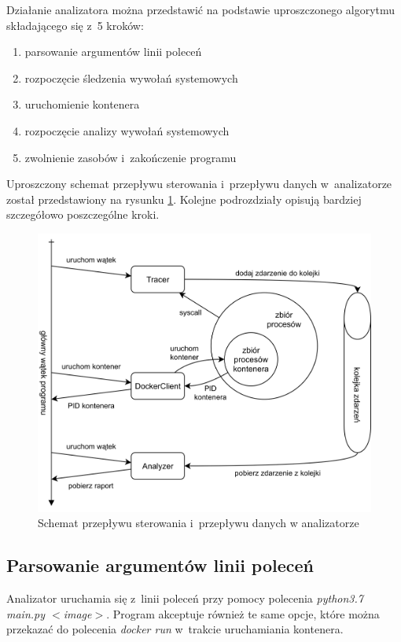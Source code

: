 Działanie analizatora można przedstawić na podstawie uproszczonego algorytmu składającego się z~5 kroków:
\begin{enumerate}
    \item parsowanie argumentów linii poleceń
    \item rozpoczęcie śledzenia wywołań systemowych
    \item uruchomienie kontenera
    \item rozpoczęcie analizy wywołań systemowych
    \item zwolnienie zasobów i~zakończenie programu
\end{enumerate}
Uproszczony schemat przepływu sterowania i~przepływu danych w~analizatorze został przedstawiony na rysunku \ref{fig:analyzerFlow}. Kolejne podrozdziały opisują bardziej szczegółowo poszczególne kroki.

\begin{figure}[ht]
    \centering
    \includegraphics[width=0.9\linewidth]{images/analyzerFlow.png}
    \caption{Schemat przepływu sterowania i~przepływu danych w analizatorze}
    \label{fig:analyzerFlow}
\end{figure}

\subsection{Parsowanie argumentów linii poleceń}

Analizator uruchamia się z~linii poleceń przy pomocy polecenia \textit{python3.7 main.py $<$image$>$}. Program akceptuje również te same opcje, które można przekazać do polecenia \textit{docker run} w~trakcie uruchamiania kontenera. 

